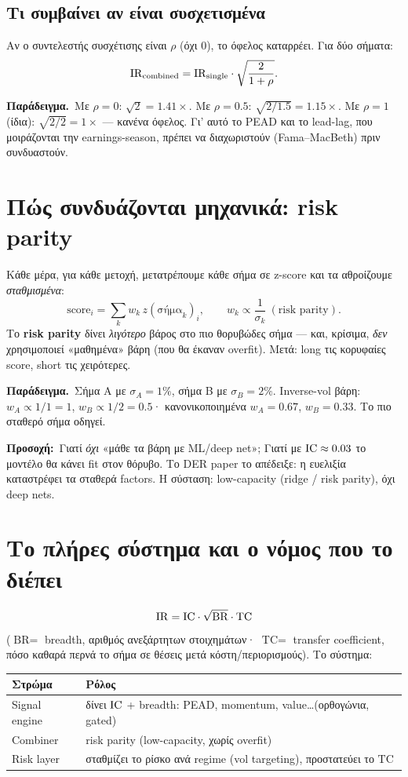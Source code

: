 \documentclass[11pt]{article}
\newcommand{\ex}[1]{\par\smallskip\noindent\textbf{\textcolor{accent}{Παράδειγμα.}}\ #1\par\smallskip}
\newcommand{\warnb}[1]{\par\medskip\noindent\colorbox{soft}{\parbox{\dimexpr\linewidth-2\fboxsep}{\textcolor{warn}{\textbf{Προσοχή:}}\ #1}}\par\medskip}
\begin{document}
\subsection{Τι συμβαίνει αν είναι συσχετισμένα}
Αν ο συντελεστής συσχέτισης είναι $\rho$ (όχι 0), το όφελος καταρρέει. Για δύο σήματα:
\[
\mathrm{IR}_{\text{combined}}=\mathrm{IR}_{\text{single}}\cdot\sqrt{\frac{2}{1+\rho}}.
\]
\ex{Με $\rho=0$: $\sqrt{2}=1.41\times$. Με $\rho=0.5$: $\sqrt{2/1.5}=1.15\times$. Με $\rho=1$ (ίδια):
$\sqrt{2/2}=1\times$ --- κανένα όφελος. Γι' αυτό το PEAD και το lead-lag, που μοιράζονται την
earnings-season, πρέπει να διαχωριστούν (Fama--MacBeth) πριν συνδυαστούν.}

\section{Πώς συνδυάζονται μηχανικά: risk parity}

Κάθε μέρα, για κάθε μετοχή, μετατρέπουμε κάθε σήμα σε z-score και τα αθροίζουμε \emph{σταθμισμένα}:
\[
\text{score}_{i}=\sum_k w_k\, z(\text{σήμα}_k)_i,\qquad w_k\propto \frac{1}{\sigma_k}\ (\text{risk parity}).
\]
Το \textbf{risk parity} δίνει \emph{λιγότερο} βάρος στο πιο θορυβώδες σήμα --- και, κρίσιμα, \emph{δεν}
χρησιμοποιεί «μαθημένα» βάρη (που θα έκαναν overfit). Μετά: long τις κορυφαίες score, short τις χειρότερες.

\ex{Σήμα A με $\sigma_A=1\%$, σήμα B με $\sigma_B=2\%$. Inverse-vol βάρη: $w_A\propto 1/1=1$,
$w_B\propto 1/2=0.5$· κανονικοποιημένα $w_A=0.67$, $w_B=0.33$. Το πιο σταθερό σήμα οδηγεί.}

\warnb{Γιατί \emph{όχι} «μάθε τα βάρη με ML/deep net»; Γιατί με $\mathrm{IC}\approx 0.03$ το μοντέλο θα κάνει fit
στον θόρυβο. Το DER paper το απέδειξε: η ευελιξία καταστρέφει τα σταθερά factors. Η σύσταση: low-capacity
(ridge / risk parity), όχι deep nets.}

\section{Το πλήρες σύστημα και ο νόμος που το διέπει}

\[
\mathrm{IR}=\mathrm{IC}\cdot\sqrt{\text{BR}}\cdot\text{TC}
\]
($\text{BR}=$ breadth, αριθμός ανεξάρτητων στοιχημάτων· $\text{TC}=$ transfer coefficient, πόσο καθαρά
περνά το σήμα σε θέσεις μετά κόστη/περιορισμούς). Το σύστημα:
\begin{center}
\begin{tabular}{ll}
\toprule
Στρώμα & Ρόλος\\
\midrule
Signal engine & δίνει $\mathrm{IC}$ + breadth: PEAD, momentum, value\dots (ορθογώνια, gated)\\
Combiner & risk parity (low-capacity, χωρίς overfit)\\
Risk layer & σταθμίζει το ρίσκο ανά regime (vol targeting), προστατεύει το $\text{TC}$\\
\bottomrule
\end{tabular}
\end{center}
\end{document}
